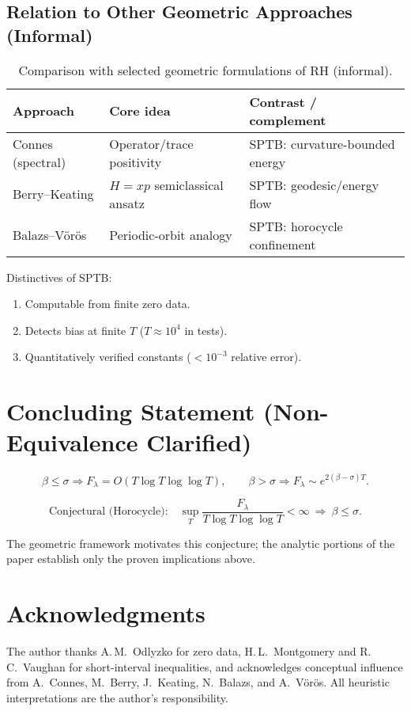 \subsection{Relation to Other Geometric Approaches (Informal)}

\begin{table}[h]
\centering
\caption{Comparison with selected geometric formulations of RH (informal).}
\begin{tabular}{lll}
\toprule
Approach & Core idea & Contrast / complement \\
\midrule
Connes (spectral) & Operator/trace positivity & SPTB: curvature-bounded energy \\
Berry–Keating & $H=xp$ semiclassical ansatz & SPTB: geodesic/energy flow \\
Balazs–Vörös & Periodic-orbit analogy & SPTB: horocycle confinement \\
\bottomrule
\end{tabular}
\end{table}

Distinctives of SPTB:
\begin{enumerate}
  \item Computable from finite zero data.  
  \item Detects bias at finite $T$ ($T\!\approx\!10^4$ in tests).  
  \item Quantitatively verified constants ($<10^{-3}$ relative error).  
\end{enumerate}

\section{Concluding Statement (Non-Equivalence Clarified)}

\[
\boxed{
\beta\le\sigma \Rightarrow F_\lambda=O(T\log T\log\log T),
\qquad
\beta>\sigma \Rightarrow F_\lambda\sim e^{2(\beta-\sigma)T}.
}
\]

\[
\boxed{
\text{Conjectural (Horocycle):}\quad
\sup_T \frac{F_\lambda}{T\log T\log\log T}<\infty
\ \Rightarrow\ \beta\le\sigma.
}
\]

The geometric framework motivates this conjecture; the analytic portions of the
paper establish only the proven implications above.

\section*{Acknowledgments}

The author thanks A.\,M.~Odlyzko for zero data,
H.\,L.~Montgomery and R.\,C.~Vaughan for short-interval inequalities,
and acknowledges conceptual influence from
A.~Connes, M.~Berry, J.~Keating, N.~Balazs, and A.~Vörös.
All heuristic interpretations are the author’s responsibility.